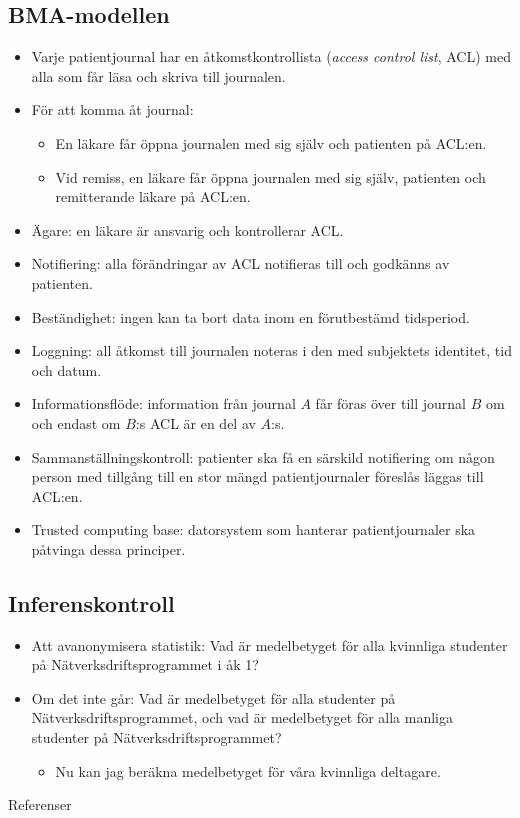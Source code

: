 \documentclass{beamer}
\begin{document}
\subsection{BMA-modellen}
\begin{frame}[allowframebreaks]{\insertsubsectionhead}
  \begin{itemize}
    \item Varje patientjournal har en åtkomstkontrollista (\emph{access control 
      list}, ACL) med alla som får läsa och skriva till journalen.
    \item För att komma åt journal:
      \begin{itemize}
        \item En läkare får öppna journalen med sig själv och patienten på 
          ACL:en.
        \item Vid remiss, en läkare får öppna journalen med sig själv, 
          patienten och remitterande läkare på ACL:en.
      \end{itemize}
    \item Ägare: en läkare är ansvarig och kontrollerar ACL.
    \item Notifiering: alla förändringar av ACL notifieras till och godkänns av 
      patienten.
    \item Beständighet: ingen kan ta bort data inom en förutbestämd tidsperiod.
    \item Loggning: all åtkomst till journalen noteras i den med subjektets 
      identitet, tid och datum.
    \item Informationsflöde: information från journal \(A\) får föras över till 
      journal \(B\) om och endast om \(B\):s ACL är en del av \(A\):s.
    \item Sammanställningskontroll: patienter ska få en särskild notifiering om 
      någon person med tillgång till en stor mängd patientjournaler föreslås 
      läggas till ACL:en.
    \item Trusted computing base: datorsystem som hanterar patientjournaler ska 
      påtvinga dessa principer.
  \end{itemize}
\end{frame}

\subsection{Inferenskontroll}
\begin{frame}{\insertsubsectionhead}
  \begin{itemize}
    \item Att avanonymisera statistik: Vad är medelbetyget för alla kvinnliga 
      studenter på Nätverksdriftsprogrammet i åk 1?
    \item Om det inte går: Vad är medelbetyget för alla studenter på 
      Nätverksdriftsprogrammet, och vad är medelbetyget för alla manliga 
      studenter på Nätverksdriftsprogrammet?
      \begin{itemize}
        \item Nu kan jag beräkna medelbetyget för våra kvinnliga deltagare.
      \end{itemize}
  \end{itemize}
\end{frame}



\begin{frame}[allowframebreaks]{Referenser}
	\small
  
\end{frame}
\end{document}

